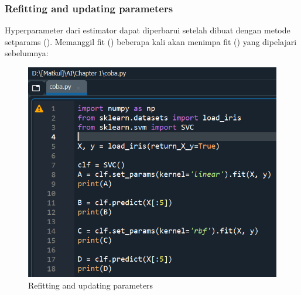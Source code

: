 \subsubsection{Refitting and updating parameters}

\par Hyperparameter dari estimator dapat diperbarui setelah dibuat dengan metode setparams (). Memanggil fit () beberapa kali akan menimpa fit () yang dipelajari sebelumnya:

    \begin{figure}[H]
    \centering
    \includegraphics[width=13cm]{figures/1184023/24.PNG}
    \caption{Refitting and updating parameters}
    \end{figure}

